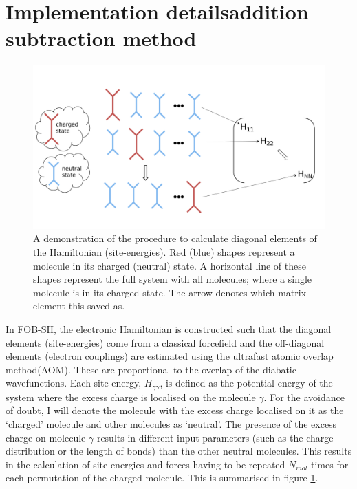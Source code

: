 \section{Implementation details\replace{ -}{: }addition subtraction method}
\label{sect:addSubMethod}
\begin{figure}[ht]
  \includegraphics[width=\textwidth]{../img/ES/ForceEnerCalc.png}
  \caption{\label{fig:FE_Calc}A demonstration of the procedure to calculate diagonal elements of the Hamiltonian (site-energies). Red (blue) shapes represent a molecule in its charged (neutral) state. A  horizontal line of these shapes represent the full system with all molecules; where a single molecule is in its charged state. The arrow denotes which matrix element this saved as.}
\end{figure}
\noindent In FOB-SH, the electronic Hamiltonian is constructed such that the diagonal elements (site-energies) come from a classical forcefield and the off-diagonal elements (electron couplings) are estimated using the ultrafast atomic overlap method(AOM). These are proportional to the overlap of the diabatic wavefunctions. Each site-energy, $H_{\gamma \gamma}$, is defined as the potential energy of the system where the excess charge is localised on the molecule $\gamma$. For the avoidance of doubt, I will denote the molecule with the excess charge localised on it as the `charged' molecule and other molecules as `neutral'. The presence of the excess charge on molecule $\gamma$ results in different input parameters (such as the charge distribution or the length of bonds) than the other neutral molecules. This results in the calculation of site-energies and forces having to be repeated $N_{mol}$ times for each permutation of the charged molecule. This is summarised in figure \ref{fig:FE_Calc}. 
\\\\
